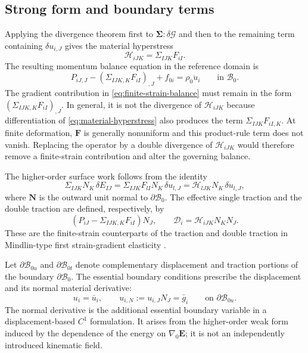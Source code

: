 \documentclass[preprint,12pt]{elsarticle}
\begin{document}
\subsection{Strong form and boundary terms}
\label{sec:strong-form-boundary-terms}

Applying the divergence theorem first to
$\boldsymbol{\Sigma}:\delta\bm{\mathcal{G}}$ and then to the remaining
term containing $\delta u_{i,J}$ gives the material hyperstress
\begin{equation}
 \mathcal{H}_{iJK}=\Sigma_{IJK}F_{iI}.
 \label{eq:material-hyperstress}
\end{equation}
The resulting momentum balance equation in the reference domain is
\begin{equation}
 P_{iJ,J}-(\Sigma_{IJK,K}F_{iI})_{,J}+f_{0i}
 =\rho_0\ddot{u}_i
 \qquad\text{in }\mathcal{B}_0.
 \label{eq:finite-strain-balance}
\end{equation}
The gradient contribution in \eqref{eq:finite-strain-balance} must
remain in the form $(\Sigma_{IJK,K}F_{iI})_{,J}$. In general, it is not
the divergence of $\mathcal{H}_{iJK}$ because differentiation of
\eqref{eq:material-hyperstress} also produces the term
$\Sigma_{IJK}F_{iI,K}$. At finite deformation, $\mathbf{F}$ is generally
nonuniform and this product-rule term does not vanish. Replacing the
operator by a double divergence of $\mathcal{H}_{iJK}$ would therefore
remove a finite-strain contribution and alter the governing balance.

The higher-order surface work follows from the identity
\begin{equation}
 \Sigma_{IJK}N_K\,\delta E_{IJ}
 =\Sigma_{IJK}F_{lI}N_K\,\delta u_{l,J}
 =\mathcal{H}_{lJK}N_K\,\delta u_{l,J},
 \label{eq:higher-order-boundary-identity}
\end{equation}
where $\mathbf{N}$ is the outward unit normal to
$\partial\mathcal{B}_0$. The effective single traction and the double traction are defined, respectively, by
\begin{equation}
 \left(P_{iJ}-\Sigma_{IJK,K}F_{iI}\right)N_J,
 \qquad
 \mathcal{D}_i=\mathcal{H}_{iJK}N_KN_J.
 \label{eq:natural-traction-operators}
\end{equation}
These are the finite-strain counterparts of the traction and double
traction in Mindlin-type first strain-gradient elasticity
\cite{MindlinEshel1968,Germain1973}.

Let $\partial\mathcal{B}_{0u}$ and
$\partial\mathcal{B}_{0t}$ denote complementary displacement and
traction portions of the boundary $\partial\mathcal{B}_0$. The essential boundary conditions prescribe the
displacement and its normal material derivative:
\begin{equation}
 u_i=\bar{u}_i,
 \qquad
 u_{i,N}:=u_{i,J}N_J=\bar{g}_i
 \qquad\text{on }\partial\mathcal{B}_{0u}.
 \label{eq:essential-boundary-conditions}
\end{equation}
The normal derivative is the additional essential boundary variable in a
displacement-based $C^1$ formulation. It arises from the higher-order
weak form induced by the dependence of the energy on
$\nabla_0\mathbf{E}$; it is not an independently introduced kinematic
field.
\end{document}

